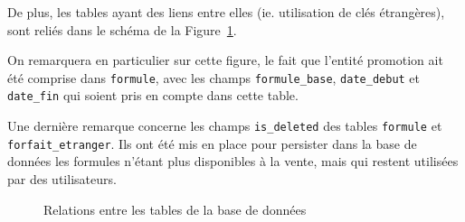 De plus, les tables ayant des liens entre elles (ie. utilisation de clés étrangères), sont reliés dans le schéma de la Figure~\ref{fig:tables}.

On remarquera en particulier sur cette figure, le fait que l'entité promotion ait été \og comprise\fg{} dans \texttt{formule}, avec les champs \texttt{formule\_base}, \texttt{date\_debut} et \texttt{date\_fin} qui soient pris en compte dans cette table.

Une dernière remarque concerne les champs \texttt{is\_deleted} des tables \texttt{formule} et \texttt{forfait\_etranger}. Ils ont été mis en place pour persister dans la base de données les formules n'étant plus disponibles à la vente, mais qui restent utilisées par des utilisateurs.

\begin{figure}[ht]
  \centering
  \resizebox{\textwidth}{!}{}
  \caption{Relations entre les tables de la base de données}
  \label{fig:tables}
\end{figure}


